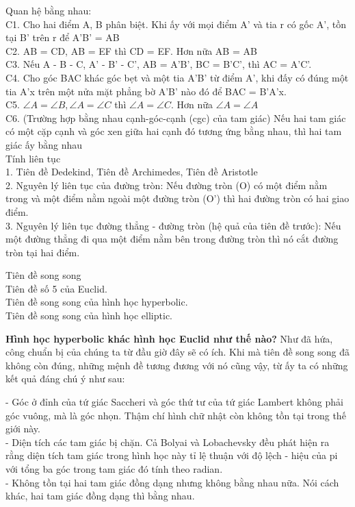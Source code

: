 \begin{multicols}{2}
	Quan hệ bằng nhau: \\
	C1. Cho hai điểm A, B phân biệt. Khi ấy với mọi điểm A’ và tia r có gốc A’, tồn tại B’ trên r để A’B’ = AB \\
	C2. AB = CD, AB = EF thì CD = EF. Hơn nữa AB = AB \\
	C3. Nếu A - B - C, A’ - B’ - C’, AB = A’B’, BC = B’C’, thì AC = A’C’. \\
	C4. Cho góc BAC khác góc bẹt và một tia A’B’ từ điểm A’, khi đấy có đúng một tia A’x trên một nửa mặt phẳng bờ A’B’ nào đó để BAC = B’A’x.\\
	C5. $ \angle A = \angle B, \angle A = \angle C$ thì $ \angle A = \angle C$. Hơn nữa $ \angle A = \angle A$ \\
	C6. (Trường hợp bằng nhau cạnh-góc-cạnh (cgc) của tam giác) Nếu hai tam giác có một cặp cạnh và góc xen giữa hai cạnh đó tương ứng bằng nhau, thì hai tam giác ấy bằng nhau \\
	
	Tính liên tục \\
	1. Tiên đề Dedekind, Tiên đề Archimedes, Tiên đề Aristotle \\
	2. Nguyên lý liên tục của đường tròn: Nếu đường tròn (O) có một điểm nằm trong và một điểm nằm ngoài một đường tròn (O’) thì hai đường tròn có hai giao điểm. \\
	3. Nguyên lý liên tục đường thẳng - đường tròn (hệ quả của tiên đề trước): Nếu một đường thẳng đi qua một điểm nằm bên trong đường tròn thì nó cắt đường tròn tại hai điểm.
	
	Tiên đề song song \\
	Tiên đề số 5 của Euclid.\\
	Tiên đề song song của hình học hyperbolic. \\ 
	Tiên đề song song của hình học elliptic.
	
	\textbf{\color{lichsutoanhoc}Hình học hyperbolic khác hình học Euclid như thế nào?}
	Như đã hứa, công chuẩn bị của chúng ta từ đầu giờ đây sẽ có ích. Khi mà tiên đề song song đã không còn đúng, những mệnh đề tương đương với nó cũng vậy, từ ấy ta có những kết quả đáng chú ý như sau:
	
	- Góc ở đỉnh của tứ giác Saccheri và góc thứ tư của tứ giác Lambert không phải góc vuông, mà là góc nhọn. Thậm chí hình chữ nhật còn không tồn tại trong thế giới này.  \\
	- Diện tích các tam giác bị chặn. Cả Bolyai và Lobachevsky đều phát hiện ra rằng diện tích tam giác trong hình học này tỉ lệ thuận với độ lệch - hiệu của pi với tổng ba góc trong tam giác đó tính theo radian. \\
	- Không tồn tại hai tam giác đồng dạng nhưng không bằng nhau nữa. Nói cách khác, hai tam giác đồng dạng thì bằng nhau. 
	

\end{multicols}

